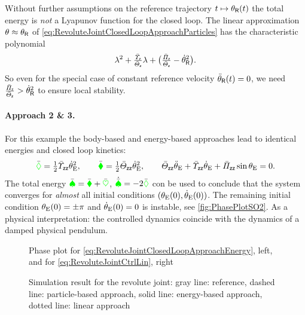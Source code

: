 Without further assumptions on the reference trajectory $t \mapsto \theta_{\mathsf{R}}(t)$ the total energy is \textit{not} a Lyapunov function for the closed loop.
The linear approximation $\theta_{} \approx \theta_{\mathsf{R}}$ of \eqref{eq:RevoluteJointClosedLoopApproachParticles} has the characteristic polynomial
\begin{align}
 \lambda^2 + \tfrac{\bar{\varUpsilon}_{\mathsf{z}}}{\bar{\varTheta}_{\mathsf{z}}} \lambda + \big( \tfrac{\bar{\varPi}_{\mathsf{z}}}{\bar{\varTheta}_{\mathsf{z}}} - \dot{\theta}_{\mathsf{R}}^2 \big).
\end{align}
So even for the special case of constant reference velocity $\ddot{\theta}_{\mathsf{R}}(t) = 0$, we need $\tfrac{\bar{\varPi}_{\mathsf{z}}}{\bar{\varTheta}_{\mathsf{z}}} > \dot{\theta}_{\mathsf{R}}^2$ to ensure local stability.

\paragraph{Approach 2 \& 3.}
For this example the body-based and energy-based approaches lead to identical energies and closed loop kinetics:
\begin{align}
 \bar{\textcolor{green}{\Diamond}} = \tfrac{1}{2} \bar{\varUpsilon}_{\mathsf{z}\mathsf{z}} \dot{\theta}_{\mathrm{E}}^2,
\qquad
 \bar{\textcolor{green}{\blacklozenge}} = \tfrac{1}{2} \bar{\varTheta}_{\mathsf{z}\mathsf{z}} \dot{\theta}_{\mathrm{E}}^2,
\qquad
 \bar{\varTheta}_{\mathsf{z}\mathsf{z}} \ddot{\theta}_{\mathrm{E}} + \bar{\varUpsilon}_{\mathsf{z}\mathsf{z}} \dot{\theta}_{\mathrm{E}} + \bar{\varPi}_{\mathsf{z}\mathsf{z}} \sin \theta_{\mathrm{E}} = 0.
\label{eq:RevoluteJointClosedLoopApproachEnergy}
\end{align}
The total energy $\bar{\textcolor{green}{\spadesuit}} = \bar{\textcolor{green}{\blacklozenge}} + \bar{\textcolor{green}{\heartsuit}}$, $\dot{\bar{\textcolor{green}{\spadesuit}}} = -2\bar{\textcolor{green}{\Diamond}}$ con be used to conclude that the system converges for \textit{almost} all initial conditions $(\theta_{\mathrm{E}}(0), \dot{\theta}_{\mathrm{E}}(0))$.
The remaining initial condition $\theta_{\mathrm{E}}(0) = \pm\pi$ and $\dot{\theta}_{\mathrm{E}}(0)=0$ is instable, see \autoref{fig:PhasePlotSO2}.
As a physical interpretation: the controlled dynamics coincide with the dynamics of a damped physical pendulum.

\begin{figure}
 \centering
 
 \caption{Phase plot for \eqref{eq:RevoluteJointClosedLoopApproachEnergy}, left, and for \eqref{eq:RevoluteJointCtrlLin}, right}
 \label{fig:PhasePlotSO2}
\end{figure}
\begin{figure}
 \centering
 
 \caption{Simulation result for the revolute joint: gray line: reference, dashed line: particle-based approach, solid line: energy-based approach, dotted line: linear approach}
 \label{fig:RevoluteJointSimRes}
\end{figure}


